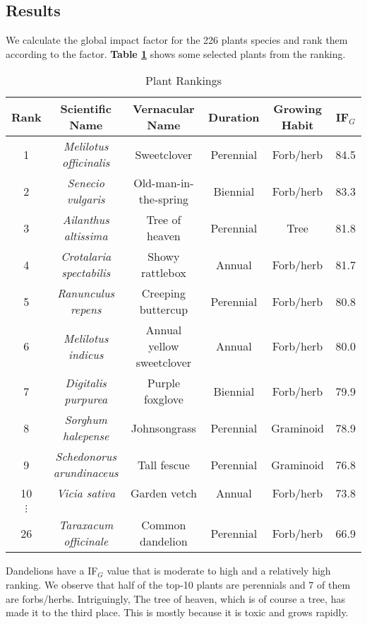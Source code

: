 \documentclass[12pt]{article}
\begin{document}
	\subsection{Results}
		
		We calculate the global impact factor for the 226 plants species and rank them according to the factor.  \textbf{Table \ref{tb:ranks}} shows some selected plants from the ranking.
		
		{
			\fontsize{10}{14}\selectfont
			{
				\begin{longtable}{cccccc}
					\caption{Plant Rankings}
					\label{tb:ranks}\\
					
					\toprule
					Rank&Scientific Name&Vernacular Name&Duration&Growing Habit&IF$_G$\\
					\toprule
					1&\textit{Melilotus officinalis}&Sweetclover&Perennial&Forb/herb&84.5\\
					2&\textit{Senecio vulgaris}&Old-man-in-the-spring&Biennial&Forb/herb&83.3\\
					3&\textit{Ailanthus altissima}&Tree of heaven&Perennial&Tree&81.8\\
					4&\textit{Crotalaria spectabilis}&Showy rattlebox&Annual&Forb/herb&81.7\\
					5&\textit{Ranunculus repens}&Creeping buttercup&Perennial&Forb/herb&80.8\\
					6&\textit{Melilotus indicus}&Annual yellow sweetclover&Annual&Forb/herb&80.0\\
					7&\textit{Digitalis purpurea}&Purple foxglove&Biennial&Forb/herb&79.9\\
					8&\textit{Sorghum halepense}&Johnsongrass&Perennial&Graminoid&78.9\\
					9&\textit{Schedonorus arundinaceus}&Tall fescue&Perennial&Graminoid&76.8\\
					10&\textit{Vicia sativa}&Garden vetch&Annual&Forb/herb&73.8\\
					$\vdots$\\
					26&\textit{Taraxacum officinale}&Common dandelion&Perennial&Forb/herb&66.9\\
					\bottomrule
				\end{longtable}
			}
		}
		
		Dandelions have a IF$_G$ value that is moderate to high and a relatively high ranking.  We observe that half of the top-10 plants are perennials and 7 of them are forbs/herbs.  Intriguingly, The tree of heaven, which is of course a tree, has made it to the third place.  This is mostly because it is toxic and grows rapidly.  
	
\end{document}
